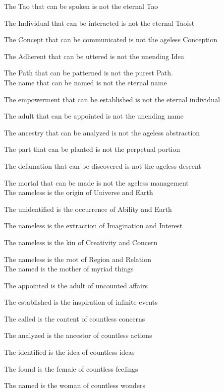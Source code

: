 \documentclass[12pt,a4paper,oneside]{book}
\begin{document}
{
\ttfamily\selectfont

The Tao that can be spoken is not the eternal Tao

The Individual that can be interacted is not the eternal Taoist

The Concept that can be communicated is not the ageless Conception

The Adherent that can be uttered is not the unending Idea

The Path that can be patterned is not the purest Path.
\\
 \linebreak
The name that can be named is not the eternal name

The empowerment that can be established is not the eternal individual

The adult that can be appointed is not the unending name

The ancestry that can be analyzed is not the ageless abstraction

The part that can be planted is not the perpetual portion

The defamation that can be discovered is not the ageless descent

The mortal that can be made is not the ageless management
\\
 \linebreak
The nameless is the origin of Universe and Earth

The unidentified is the occurrence of Ability and Earth

The nameless is the extraction of Imagination and Interest

The nameless is the kin of Creativity and Concern

The nameless is the root of Region and Relation
 \pagebreak \\
  
The named is the mother of myriad things

The appointed is the adult of uncounted affairs

The established is the inspiration of infinite events

The called is the content of countless concerns

The analyzed is the ancestor of countless actions

The identified is the idea of countless ideas

The found is the female of countless feelings

The named is the woman of countless wonders

}
\end{document}
